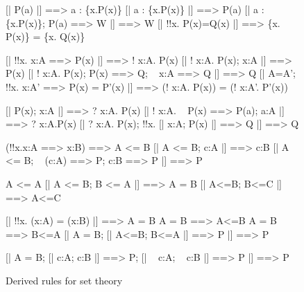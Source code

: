 \begin{figure} \makeatother
\begin{ttbox}
      [| P(a) |] ==> a : \{x.P(x)\}
      [| a : \{x.P(x)\} |] ==> P(a)
      [| a : \{x.P(x)\};  P(a) ==> W |] ==> W
  [| !!x. P(x)=Q(x) |] ==> \{x. P(x)\} = \{x. Q(x)\}

         [| !!x. x:A ==> P(x) |] ==> ! x:A. P(x)
         [| ! x:A. P(x);  x:A |] ==> P(x)
         [| ! x:A. P(x);  P(x) ==> Q;  ~ x:A ==> Q |] ==> Q
     [| A=A';  !!x. x:A' ==> P(x) = P'(x) |] ==>
              (! x:A. P(x)) = (! x:A'. P'(x))

          [| P(x);  x:A |] ==> ? x:A. P(x)
         [| ! x:A. ~ P(x) ==> P(a);  a:A |] ==> ? x:A.P(x)
          [| ? x:A. P(x);  !!x. [| x:A; P(x) |] ==> Q  |] ==> Q

         (!!x.x:A ==> x:B) ==> A <= B
         [| A <= B;  c:A |] ==> c:B
        [| A <= B;  ~ (c:A) ==> P;  c:B ==> P |] ==> P

     A <= A
  [| A <= B;  B <= A |] ==> A = B
    [| A<=B;  B<=C |] ==> A<=C

         [| !!x. (x:A) = (x:B) |] ==> A = B
      A = B ==> A<=B
      A = B ==> B<=A
       [| A = B;  [| A<=B; B<=A |] ==> P |]  ==>  P

      [| A = B;  [| c:A; c:B |] ==> P;  
                           [| ~ c:A; ~ c:B |] ==> P 
                |]  ==>  P
\end{ttbox}
\caption{Derived rules for set theory} \label{hol-set1}
\end{figure}


